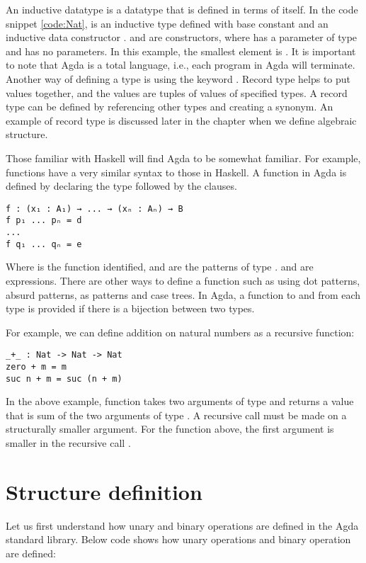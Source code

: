 An inductive datatype is a datatype that is defined in terms of itself. In the
code snippet \ref{code:Nat},  is an inductive type defined with base
constant  and an inductive data constructor .
 and  are constructors, where  has a
parameter of type  and  has no parameters. In this
example, the smallest element is . It is important to note that
Agda is a total language, i.e., each program in Agda will
terminate\cite{kidney2020finiteness}. Another way of defining a type is using
the keyword . Record type helps to put values together, and the
values are tuples of values of specified types. A record type can be defined by
referencing other types and creating a synonym. An example of record type is
discussed later in the chapter when we define algebraic structure.

Those familiar with Haskell will find Agda to be somewhat familiar. For example,
functions have a very similar syntax to those in Haskell. A function in Agda is
defined by declaring the type followed by the clauses.

\begin{verbatim}
f : (x₁ : A₁) → ... → (xₙ : Aₙ) → B
f p₁ ... pₙ = d
...
f q₁ ... qₙ = e
\end{verbatim} 
Where  is the function identified,  and  are the
patterns of type .  and  are expressions. There
are other ways to define a function such as using dot patterns, absurd patterns,
as patterns and case trees. In Agda, a function to and from each type is
provided if there is a bijection between two types.

For example, we can define addition on natural numbers as a recursive function:

\label{code:Add}
\begin{verbatim}
_+_ : Nat -> Nat -> Nat
zero + m = m
suc n + m = suc (n + m)
\end{verbatim}

In the above example, function \inline{_+_} takes two arguments of type
 and returns a value that is sum of the two arguments of type
. A recursive call must be made on a structurally smaller argument.
For the function \inline{_+_} above, the first argument  is smaller in
the recursive call . 

\section{Structure definition}
Let us first understand how unary and binary operations are defined in the Agda
standard library. Below code shows how unary operations  and binary
operation  are defined:

